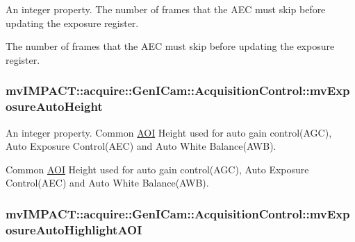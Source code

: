 An integer property. The number of frames that the A\+E\+C must skip before updating the exposure register. 

The number of frames that the A\+E\+C must skip before updating the exposure register. \hypertarget{classmv_i_m_p_a_c_t_1_1acquire_1_1_gen_i_cam_1_1_acquisition_control_ac5e32fc9dbfc9ca6dae425bfe40aa228}{
\subsubsection[{mv\+Exposure\+Auto\+Height}]{ mv\+I\+M\+P\+A\+C\+T\+::acquire\+::\+Gen\+I\+Cam\+::\+Acquisition\+Control\+::mv\+Exposure\+Auto\+Height}}\label{classmv_i_m_p_a_c_t_1_1acquire_1_1_gen_i_cam_1_1_acquisition_control_ac5e32fc9dbfc9ca6dae425bfe40aa228}


An integer property. Common \hyperlink{struct_a_o_i}{A\+O\+I} Height used for auto gain control(\+A\+G\+C), Auto Exposure Control(\+A\+E\+C) and Auto White Balance(\+A\+W\+B). 

Common \hyperlink{struct_a_o_i}{A\+O\+I} Height used for auto gain control(\+A\+G\+C), Auto Exposure Control(\+A\+E\+C) and Auto White Balance(\+A\+W\+B). \hypertarget{classmv_i_m_p_a_c_t_1_1acquire_1_1_gen_i_cam_1_1_acquisition_control_aac9696f4ac67e8d763e65018ba2853e3}{
\subsubsection[{mv\+Exposure\+Auto\+Highlight\+A\+O\+I}]{ mv\+I\+M\+P\+A\+C\+T\+::acquire\+::\+Gen\+I\+Cam\+::\+Acquisition\+Control\+::mv\+Exposure\+Auto\+Highlight\+A\+O\+I}}\label{classmv_i_m_p_a_c_t_1_1acquire_1_1_gen_i_cam_1_1_acquisition_control_aac9696f4ac67e8d763e65018ba2853e3}


